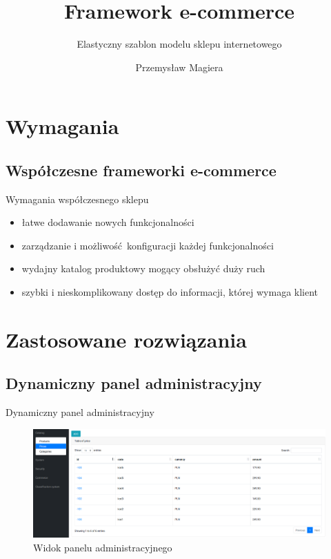 \documentclass[polish,xcolor=table,9pt,aspectratio=1610,hyperref={pdfpagemode=FullScreen}]{beamer}
\title{Framework e-commerce}
\subtitle{Elastyczny szablon modelu sklepu internetowego}
\author{Przemysław Magiera}
\begin{document}
\frame{\titlepage}

\section{Wymagania}
\subsection{Współczesne frameworki e-commerce}

\begin{frame}{Wymagania współczesnego sklepu}
\begin{itemize}
\item<1-> łatwe dodawanie nowych funkcjonalności 
\item<1-> zarządzanie i możliwość konfiguracji każdej funkcjonalności
\item<1-> wydajny katalog produktowy mogący obsłużyć duży ruch
\item<1-> szybki i nieskomplikowany dostęp do informacji, której wymaga klient

\end{itemize}
\end{frame}


\section{Zastosowane rozwiązania}

\subsection{Dynamiczny panel administracyjny}
\begin{frame}{Dynamiczny panel administracyjny}
\begin{figure}
	\begin{center}
		\includegraphics[scale=0.22]{admin-main.png}
	\end{center}
	\caption{{\color{black}Widok panelu administracyjnego}} 
\end{figure}
\end{frame}
\end{document}
